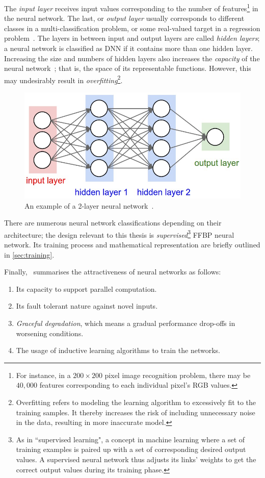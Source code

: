The \textit{input layer} receives input values corresponding to the number of features\footnote{For instance, in a $200 \times 200$ pixel image recognition problem, there may be $40,000$ features corresponding to each individual pixel's RGB values.} in the neural network. The last, or \textit{output layer} usually corresponds to different classes in a multi-classification problem, or some real-valued target in a regression problem~\cite{Kar16}. The layers in between input and output layers are called \textit{hidden layers}; a neural network is classified as DNN if it contains more than one hidden layer. Increasing the size and numbers of hidden layers also increases the \textit{capacity} of the neural network~\cite{Kar16}; that is, the space of its representable functions. However, this may undesirably result in \textit{overfitting}\footnote{Overfitting refers to modeling the learning algorithm to excessively fit to the training samples. It thereby increases the risk of including unnecessary noise in the data, resulting in more inaccurate model.}.

\begin{figure}
  \centerline{\includegraphics[width=0.7\linewidth]{neural_net2.jpeg}}
  \caption{An example of a 2-layer neural network~\cite{Kar16}.}
  \label{fig:neural-network}
\end{figure}

There are numerous neural network classifications depending on their architecture; the design relevant to this thesis is \textit{supervised}\footnote{As in ``supervised learning", a concept in machine learning where a set of training examples is paired up with a set of corresponding desired output values. A supervised neural network thus adjusts its links' weights to get the correct output values during its training phase.} FFBP neural network. Its training process and mathematical representation are briefly outlined in \ref{sec:training}.

Finally,~\cite{Nor14} summarises the attractiveness of neural networks as follows:
\begin{enumerate}
\item Its capacity to support parallel computation.
\item Its fault tolerant nature against novel inputs.
\item \textit{Graceful degradation}, which means a gradual performance drop-offs in worsening conditions.
\item The usage of inductive learning algorithms to train the networks.
\end{enumerate}

